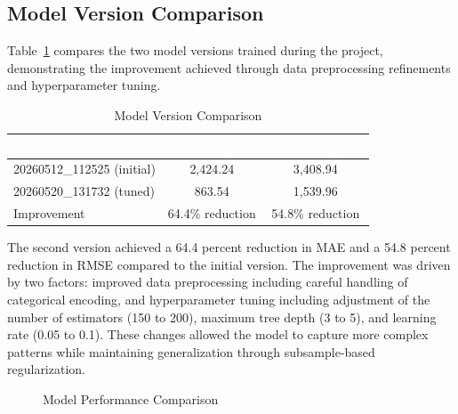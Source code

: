 \documentclass[12pt,a4paper,oneside]{report}
\begin{document}
\subsection{Model Version Comparison}
Table~\ref{tab:model-versions} compares the two model versions trained during the project, demonstrating the improvement achieved through data preprocessing refinements and hyperparameter tuning.

\begin{table}[H]
\centering
\caption{Model Version Comparison}
\label{tab:model-versions}
\renewcommand{\arraystretch}{1.4}
\begin{tabularx}{\textwidth}{Xcc}
\toprule
\rowcolor{headerblue}
\textcolor{white}{\textbf{Version}} & \textcolor{white}{\textbf{MAE (kg/ha)}} & \textcolor{white}{\textbf{RMSE (kg/ha)}} \\
\midrule
20260512\_112525 (initial) & 2,424.24 & 3,408.94 \\
\rowcolor{rowalt}
20260520\_131732 (tuned) & 863.54 & 1,539.96 \\
Improvement & 64.4\% reduction & 54.8\% reduction \\
\bottomrule
\end{tabularx}
\end{table}

The second version achieved a 64.4 percent reduction in MAE and a 54.8 percent reduction in RMSE compared to the initial version. The improvement was driven by two factors: improved data preprocessing including careful handling of categorical encoding, and hyperparameter tuning including adjustment of the number of estimators (150 to 200), maximum tree depth (3 to 5), and learning rate (0.05 to 0.1). These changes allowed the model to capture more complex patterns while maintaining generalization through subsample-based regularization.

\begin{figure}[H]
\centering
{}
\caption{Model Performance Comparison}
\label{fig:model-comparison}
\end{figure}
\end{document}
